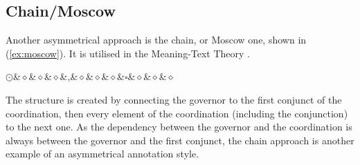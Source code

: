 \subsection{Chain/Moscow}
Another asymmetrical approach is the chain, or Moscow one, shown in (\ref{ex:moscow}). It is utilised in the Meaning-Text Theory \citep{melcuk-1988}. 

\begin{exe}
\centering
\ex\label{ex:moscow}
\begin{dependency}[theme = simple, baseline=-\the\dimexpr\fontdimen22\textfont2\relax]
            \begin{deptext}
    $\odot$\&$\diamond$\&$\diamond$\&$\diamond$\&,\&$\diamond$\&$\diamond$\&$\diamond$\&$\square$\&$\diamond$\&$\diamond$\&$\diamond$\\
            \end{deptext}
        \end{dependency}
\end{exe}

The structure is created by connecting the governor to the first conjunct of the coordination, then every element of the coordination (including the conjunction) to the next one. As the dependency between the governor and the coordination is always between the governor and the first conjunct, the chain approach is another example of an asymmetrical annotation style. 

